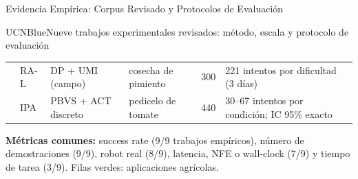 \documentclass[aspectratio=169,10pt,xcolor={dvipsnames,table}]{beamer}
\begin{document}
\begin{frame}{Evidencia Empírica: Corpus Revisado y Protocolos de Evaluación}
\begin{Card}{UCNBlue}{Nueve trabajos experimentales revisados: método, escala y protocolo de evaluación}
{\begin{tabular}{@{}L{21mm} L{11mm} L{24mm} L{28mm} L{16mm} L{41mm}@{}}
       \cite{kim2025pepper} & RA-L & DP + UMI (campo) & cosecha de pimiento & 300 & 221 intentos por dificultad (3 días) \\
       \cite{rong2026tomato} & IPA & PBVS + ACT discreto & pedicelo de tomate & 440 & 30--67 intentos por condición; IC 95\% exacto \\
      \bottomrule
    \end{tabular}\par
    \vspace{1mm}
    \textcolor{TextDark!80}{\textbf{Métricas comunes:} success rate (9/9 trabajos empíricos), número de demostraciones (9/9), robot real (8/9), latencia, NFE o wall-clock (7/9) y tiempo de tarea (3/9). Filas verdes: aplicaciones agrícolas.}\par}
  \end{Card}
\end{frame}
\end{document}
